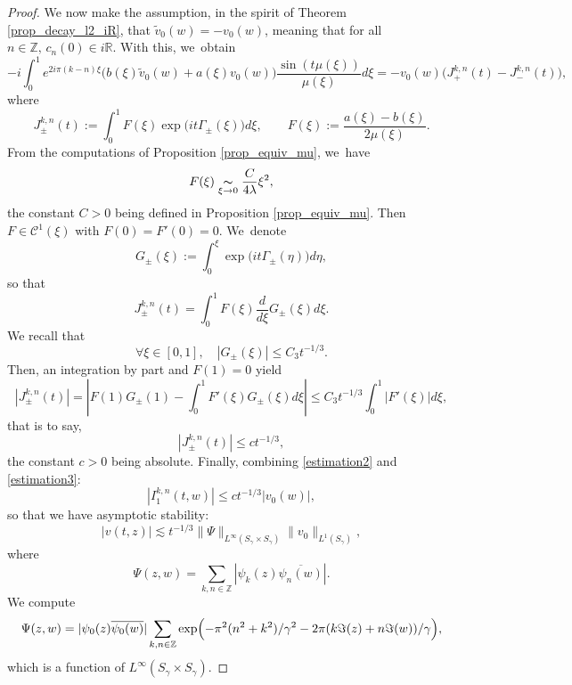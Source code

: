 \documentclass[JEP,XML,SOM,Unicode,NoFloatCountersInSection,published]{cedram}
\theoremstyle{definition}
\let\EE\exp
\let\ov\overline
\newcommand\R{\mathbb R}
\newcommand\Z{\mathbb Z}
\newcommand{\bpa}[1]{\bigl(#1\bigr)}
\newcommand{\abs}[1]{\left|#1\right|}
\newcommand{\simx}[2]{\underset{#1\to#2}{\thicksim}}
\begin{document}
\begin{proof}
We now make the assumption, in the spirit of Theorem \ref{prop_decay_l2_iR}, that $\widetilde{v}_0(w) = -v_0(w)$, meaning that for all $n \in \Z, \, c_n(0) \in i\R$. With this, we~obtain
\begin{equation*}
- i \int_0^1 e^{2i\pi(k-n)\xi}\bigl(b(\xi)\widetilde{v}_0(w)+a(\xi)v_0(w)\bigr) \frac{\sin(t\mu(\xi))}{\mu(\xi)} d\xi = -v_0(w) \bpa{J_{+}^{k,n}(t)-J_{-}^{k,n}(t)},
\end{equation*}
where
\[
J_\pm^{k,n}(t):= \int_0^1 F(\xi)\EE\bigl({it\Gamma_\pm(\xi)}\bigr)d\xi, \qquad F(\xi):= \frac{a(\xi) - b(\xi)}{2\mu(\xi)}.
\]
From the computations of Proposition \ref{prop_equiv_mu}, we~have
\[
F(\xi) \simx{\xi}{0} \frac{C}{4\lambda} \xi^2,
\]
the constant $C >0$ being defined in Proposition \ref{prop_equiv_mu}. Then $F \in \mathcal{C}^1(\xi)$ with $F(0) = F'(0) = 0$. We~denote
\[
G_\pm(\xi):= \int_0^\xi \EE\bigl({it\Gamma_\pm(\eta)}\bigr) d\eta,
\]
so that
\[
J_\pm^{k,n}(t) = \int_0^1 F(\xi)\frac{d}{d\xi}G_\pm(\xi)d\xi. 
\]
We recall that
\[
\forall \xi \in [0,1], \quad |G_\pm(\xi)| \leq {C_3}{t^{-1/3}}.
\]
Then, an integration by part and $F(1) = 0$ yield
\[
|J_\pm^{k,n}(t)| =\abs{ F(1)G_\pm(1) - \int_0^1 F'(\xi)G_\pm(\xi)d\xi} \leq {C_3}{ t^{-1/3}}\int_0^1 |F'(\xi)|d\xi,
\]
that is to say,
\begin{equation}\label{estimation3}
|J_\pm^{k,n}(t)| \leq {c}{t^{-1/3}},
\end{equation}
the constant $c>0$ being absolute. Finally, combining \eqref{estimation2} and \eqref{estimation3}:
\begin{equation*}
|I_1^{k,n}(t,w)| \leq {c}{t^{-1/3}}|v_0(w)|,
\end{equation*}
so that we have asymptotic stability:
\begin{equation}\label{estimation_u_l_infty}
|v(t,z)| \lesssim {t^{-1/3}}\|\Psi\|_{L^\infty(S_{\gamma}\times S_{\gamma})}\|v_0\|_{L^1(S_{\gamma})},
\end{equation}
where
\begin{equation*}
\Psi(z,w) = \sum_{k,n\in\Z}|\psi_k(z)\ov{\psi_n(w)}|.
\end{equation*}
We compute
\[
\Psi(z,w) =|\psi_0(z)\ov{\psi_0(w)}| \sum_{k,n\in\Z} \EE\Bigl({-{\pi^2(n^2+k^2)}/ {\gamma^2}-{2\pi}(k\Im (z)+n\Im (w))/ {\gamma}}\Bigr), 
\]
which is a function of $L^\infty(S_{\gamma}\times S_{\gamma})$.


\end{proof}
\end{document}
